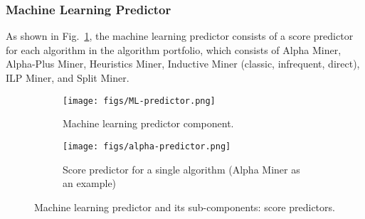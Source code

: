 \subsubsection{Machine Learning Predictor}
As shown in Fig.~\ref{fig:ML-predictor}, the machine learning predictor consists of a score predictor for each algorithm in the algorithm portfolio, which consists of Alpha Miner, Alpha-Plus Miner, Heuristics Miner, Inductive Miner (classic, infrequent, direct), ILP Miner, and Split Miner. 



\begin{figure}[h!]
    \vspace{-2em}
    \centering
        \begin{subfigure}[b]{.9\linewidth}
            \texttt{[image: figs/ML-predictor.png]}
            \caption{
                Machine learning predictor component.
            } \label{fig:ML-predictor}
        \end{subfigure}
        \begin{subfigure}[b]{.9\linewidth}
            \texttt{[image: figs/alpha-predictor.png]}
                \caption{
                    Score predictor for a single algorithm (Alpha Miner as an example)
                } \label{fig:alpha-predictor}
        \end{subfigure}
    \caption{Machine learning predictor and its sub-components: score predictors.}
    \label{fig:ML-predictor-component}
    \vspace{-1.5em}
\end{figure}


